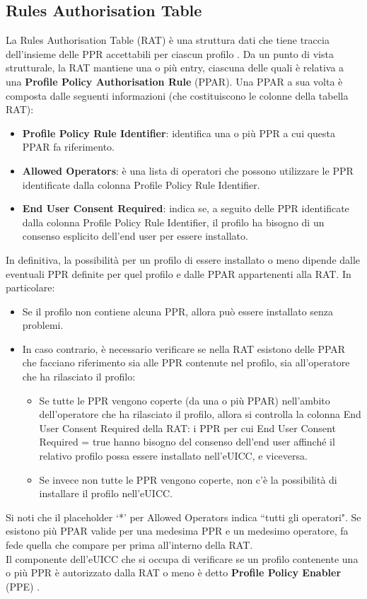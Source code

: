 \documentclass[10pt, oneside]{book}
\begin{document}
\subsection{Rules Authorisation Table}\label{sec:rat}
La Rules Authorisation Table (RAT) è una struttura dati che tiene traccia dell'insieme delle PPR accettabili per ciascun profilo \cite{GSMA-docs-new}. Da un punto di vista strutturale, la RAT mantiene una o più entry, ciascuna delle quali è relativa a una \textbf{Profile Policy Authorisation Rule} (PPAR). Una PPAR a sua volta è composta dalle seguenti informazioni (che costituiscono le colonne della tabella RAT):
\begin{itemize}
\item \textbf{Profile Policy Rule Identifier}: identifica una o più PPR a cui questa PPAR fa riferimento.
\item \textbf{Allowed Operators}: è una lista di operatori che possono utilizzare le PPR identificate dalla colonna Profile Policy Rule Identifier.
\item \textbf{End User Consent Required}: indica se, a seguito delle PPR identificate dalla colonna Profile Policy Rule Identifier, il profilo ha bisogno di un consenso esplicito dell'end user per essere installato.
\end{itemize}
In definitiva, la possibilità per un profilo di essere installato o meno dipende dalle eventuali PPR definite per quel profilo e dalle PPAR appartenenti alla RAT. In particolare:
\begin{itemize}
\item Se il profilo non contiene alcuna PPR, allora può essere installato senza problemi.
\item In caso contrario, è necessario verificare se nella RAT esistono delle PPAR che facciano riferimento sia alle PPR contenute nel profilo, sia all'operatore che ha rilasciato il profilo:
\begin{itemize}[itemsep=0pt]
\item Se tutte le PPR vengono coperte (da una o più PPAR) nell'ambito dell'operatore che ha rilasciato il profilo, allora si controlla la colonna End User Consent Required della RAT: i PPR per cui End User Consent Required = true hanno bisogno del consenso dell'end user affinché il relativo profilo possa essere installato nell'eUICC, e viceversa.
\item Se invece non tutte le PPR vengono coperte, non c'è la possibilità di installare il profilo nell'eUICC.
\end{itemize}
\end{itemize}
Si noti che il placeholder `*' per Allowed Operators indica ``tutti gli operatori". Se esistono più PPAR valide per una medesima PPR e un medesimo operatore, fa fede quella che compare per prima all'interno della RAT.\\
Il componente dell'eUICC che si occupa di verificare se un profilo contenente una o più PPR è autorizzato dalla RAT o meno è detto \textbf{Profile Policy Enabler} (PPE) \cite{GSMA-docs-new}.
\end{document}
